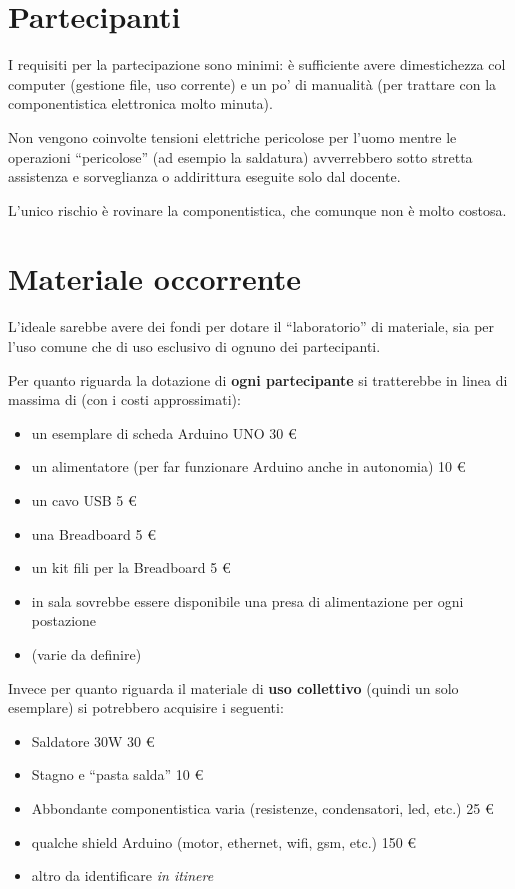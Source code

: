 \documentclass[a4paper,12pt]{article}
\begin{document}
\section*{Partecipanti}

I requisiti per la partecipazione sono minimi: è sufficiente avere 
dimestichezza col computer (gestione file, uso corrente) e un po' di manualità 
(per trattare con la componentistica elettronica molto minuta).

Non vengono coinvolte tensioni elettriche pericolose per l'uomo mentre le 
operazioni ``pericolose'' (ad esempio la saldatura) avverrebbero sotto stretta 
assistenza e sorveglianza o addirittura eseguite solo dal docente.

L'unico rischio è rovinare la componentistica, che comunque non è molto costosa.


\section*{Materiale occorrente}

L'ideale sarebbe avere dei fondi per dotare il ``laboratorio'' di materiale, 
sia per l'uso comune che di uso esclusivo di ognuno dei partecipanti.

Per quanto riguarda la dotazione di \textbf{ogni partecipante} si tratterebbe 
in linea di massima di (con i costi approssimati):

\begin{itemize}
 \item un esemplare di scheda Arduino UNO \hfill 30 €
 \item un alimentatore (per far funzionare Arduino anche in autonomia) \hfill 
10 €
 \item un cavo USB \hfill 5 €
 \item una Breadboard \hfill 5 €
 \item un kit fili per la Breadboard \hfill 5 €
 \item in sala sovrebbe essere disponibile una presa di alimentazione per ogni 
postazione
 \item (varie da definire)
\end{itemize}

Invece per quanto riguarda il materiale di \textbf{uso 
collettivo} (quindi un solo esemplare) si potrebbero acquisire i seguenti:

\begin{itemize}
 \item Saldatore 30W  \hfill 30 €
 \item Stagno e ``pasta salda'' \hfill 10 €
 \item Abbondante componentistica varia (resistenze, condensatori, led, 
etc.) \hfill 25 €
 \item qualche shield Arduino (motor, ethernet, wifi, gsm, etc.) \hfill 
150 €
 \item altro da identificare \textit{in itinere}
\end{itemize}
\end{document}

